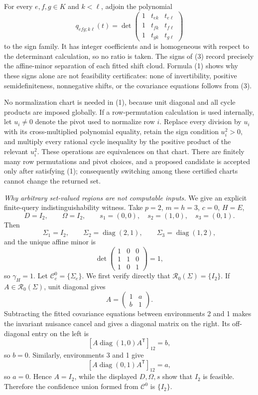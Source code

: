 For every \(e,f,g\in K\) and \(k<\ell\), adjoin the polynomial
\[
q_{efg;k\ell}(t)=
\det\begin{pmatrix}
1&t_{ek}&t_{e\ell}\\
1&t_{fk}&t_{f\ell}\\
1&t_{gk}&t_{g\ell}
\end{pmatrix}
\tag{3}
\]
to the sign family.  It has integer coefficients and is homogeneous with respect to the determinant calculation, so no ratio is taken.  The signs of (3) record precisely the affine-minor separation of each fitted shift cloud.  Formula (1) shows why these signs alone are not feasibility certificates: none of invertibility, positive semidefiniteness, nonnegative shifts, or the covariance equations follows from (3).

No normalization chart is needed in (1), because unit diagonal and all cycle products are imposed globally.  If a row-permutation calculation is used internally, let \(u_i\ne0\) denote the pivot used to normalize row \(i\).  Replace every division by \(u_i\) with its cross-multiplied polynomial equality, retain the sign condition \(u_i^2>0\), and multiply every rational cycle inequality by the positive product of the relevant \(u_i^2\).  These operations are equivalences on that chart.  There are finitely many row permutations and pivot choices, and a proposed candidate is accepted only after satisfying (1); consequently switching among these certified charts cannot change the returned set.

\emph{Why arbitrary set-valued regions are not computable inputs.}  We give an explicit finite-query indistinguishability witness.  Take \(p=2\), \(m=h=3\), \(c=0\), \(H=E\),
\[
D=I_2,\qquad \Omega=I_2,\qquad
s_1=(0,0),\quad s_2=(1,0),\quad s_3=(0,1).
\]
Then
\[
\Sigma_1=I_2,\qquad \Sigma_2=\operatorname{diag}(2,1),\qquad
\Sigma_3=\operatorname{diag}(1,2),
\]
and the unique affine minor is
\[
\det\begin{pmatrix}1&0&0\\1&1&0\\1&0&1\end{pmatrix}=1,
\]
so \(\gamma_H=1\).  Let \(\mathcal C^0_e=\{\Sigma_e\}\).  We first verify directly that \(\mathcal R_0(\Sigma)=\{I_2\}\).  If \(A\in\mathcal R_0(\Sigma)\), unit diagonal gives
\[
A=\begin{pmatrix}1&a\\b&1\end{pmatrix}.
\]
Subtracting the fitted covariance equations between environments 2 and 1 makes the invariant nuisance cancel and gives a diagonal matrix on the right.  Its off-diagonal entry on the left is
\[
\left[A\operatorname{diag}(1,0)A^{\mathsf T}\right]_{12}=b,
\]
so \(b=0\).  Similarly, environments 3 and 1 give
\[
\left[A\operatorname{diag}(0,1)A^{\mathsf T}\right]_{12}=a,
\]
so \(a=0\).  Hence \(A=I_2\), while the displayed \(D,\Omega,s\) show that \(I_2\) is feasible.  Therefore the confidence union formed from \(\mathcal C^0\) is \(\{I_2\}\).

